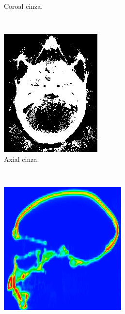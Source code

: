 \documentclass{article}
\begin{document}
\begin{figure}
\begin{subfigure}[b]{0.3\textwidth}
        \caption{Coroal cinza.}
    \end{subfigure}
    ~
    \begin{subfigure}[b]{0.3\textwidth}
        \includegraphics[width=\textwidth]{skull/radiologist-axial-gray.png}
        \caption{Axial cinza.}
    \end{subfigure}
    ~
    \begin{subfigure}[b]{0.3\textwidth}
        \includegraphics[width=\textwidth]{skull/radiologist-sagital.png}

\end{subfigure}
\end{figure}
\end{document}
